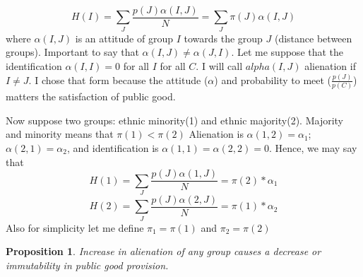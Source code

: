 \documentclass[letterpaper,11pt]{article}
\newtheorem{proposition}{Proposition}
\begin{document}
\[ H(I) = \sum_{J} \frac{p(J) \alpha(I, J)}{N} = \sum_{J} \pi(J) \alpha(I,J) \]
where $\alpha(I, J)$ is an attitude of group $I$ towards the group $J$ (distance between groups). Important to say that $\alpha(I, J) \ne \alpha(J, I)$. Let me suppose that the identification $\alpha(I,I) = 0$ for all $I$ for all $C$. I will call $alpha(I, J)$ alienation if $I \ne J$. I chose that form because the attitude ($\alpha$) and probability to meet ($\frac{p(J)}{p(C)}$) matters the satisfaction of public good.

Now suppose two groups: ethnic minority(1) and ethnic majority(2). Majority and minority means that $\pi(1) < \pi(2)$ Alienation is $\alpha(1,2) = \alpha_1$; $\alpha(2,1) = \alpha_2$, and identification is $\alpha(1,1) = \alpha(2,2) = 0$. Hence, we may say that
\[ H(1) = \sum_{J} \frac{p(J) \alpha(1, J)}{N} = \pi(2) * \alpha_1 \]
\[ H(2) = \sum_{J} \frac{p(J) \alpha(2, J)}{N} = \pi(1) * \alpha_2 \]
Also for simplicity let me define $\pi_1 = \pi(1)$ and $\pi_2 = \pi(2)$

\begin{proposition}
    Increase in alienation of any group causes a decrease or immutability in public good provision.
\end{proposition}
\end{document}
